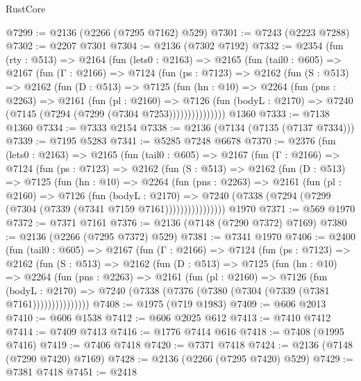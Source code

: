\begin{lexlean}{RustCore}
\begin{coremodule}
@7299 := @2136 (@2266 (@7295 @7162) @529)
@7301 := @7243 (@2223 @7288)
@7302 := @2207 @7301
@7304 := @2136 (@7302 @7192)
@7332 := @2354
    (fun (rty : @513) =>
    @2164
      (fun (lets0 : @2163) =>
      @2165
        (fun (tail0 : @605) =>
        @2167
          (fun (Γ : @2166) =>
          @7124
            (fun (ps : @7123) =>
            @2162
              (fun (S : @513) =>
              @2162
                (fun (D : @513) =>
                @7125
                  (fun (hn : @10) =>
                  @2264
                    (fun (pns : @2263) =>
                    @2161
                      (fun (pl : @2160) =>
                      @7126
                        (fun (bodyL : @2170) =>
                        @7240 (@7145 (@7294 (@7299 (@7304 @7253)))))))))))))))
    @1360
@7333 := @7138 @1360
@7334 := @7333 @2154
@7338 := @2136 (@7134 (@7135 (@7137 @7334)))
@7339 := @7195 @5283
@7341 := @5285 @7248 @6678
@7370 := @2376
    (fun (lets0 : @2163) =>
    @2165
      (fun (tail0 : @605) =>
      @2167
        (fun (Γ : @2166) =>
        @7124
          (fun (ps : @7123) =>
          @2162
            (fun (S : @513) =>
            @2162
              (fun (D : @513) =>
              @7125
                (fun (hn : @10) =>
                @2264
                  (fun (pns : @2263) =>
                  @2161
                    (fun (pl : @2160) =>
                    @7126
                      (fun (bodyL : @2170) =>
                      @7240 (@7338 (@7294 (@7299 (@7304 (@7339 (@7341 @7159 @7161))))))))))))))))
    @1970
@7371 := @569 @1970
@7372 := @7371 @7161
@7376 := @2136 (@7148 (@7290 @7372) @7169)
@7380 := @2136 (@2266 (@7295 @7372) @529)
@7381 := @7341 @1970
@7406 := @2400
    (fun (tail0 : @605) =>
    @2167
      (fun (Γ : @2166) =>
      @7124
        (fun (ps : @7123) =>
        @2162
          (fun (S : @513) =>
          @2162
            (fun (D : @513) =>
            @7125
              (fun (hn : @10) =>
              @2264
                (fun (pns : @2263) =>
                @2161
                  (fun (pl : @2160) =>
                  @7126
                    (fun (bodyL : @2170) =>
                    @7240 (@7338 (@7376 (@7380 (@7304 (@7339 (@7381 @7161)))))))))))))))
@7408 := @1975 (@719 @1983)
@7409 := @606 @2013
@7410 := @606 @1538
@7412 := @606 @2025 @612
@7413 := @7410 @7412
@7414 := @7409 @7413
@7416 := @1776 @7414 @616
@7418 := @7408 (@1995 @7416)
@7419 := @7406 @7418
@7420 := @7371 @7418
@7424 := @2136 (@7148 (@7290 @7420) @7169)
@7428 := @2136 (@2266 (@7295 @7420) @529)
@7429 := @7381 @7418
@7451 := @2418

\end{coremodule}
\end{lexlean}

